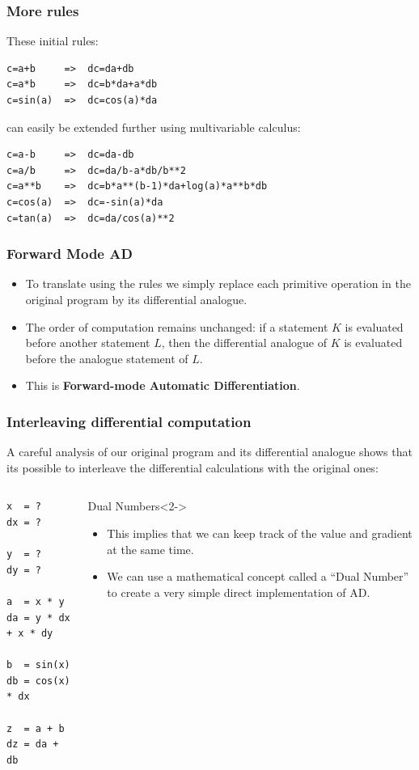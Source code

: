 \documentclass[]{article}
\begin{document}
\begin{frame}[fragile]
\frametitle{More rules}

These initial rules:
\begin{lstlisting}
c=a+b     =>  dc=da+db
c=a*b     =>  dc=b*da+a*db
c=sin(a)  =>  dc=cos(a)*da
\end{lstlisting}
can easily be extended further using multivariable calculus:
\begin{lstlisting}
c=a-b     =>  dc=da-db
c=a/b     =>  dc=da/b-a*db/b**2
c=a**b    =>  dc=b*a**(b-1)*da+log(a)*a**b*db
c=cos(a)  =>  dc=-sin(a)*da
c=tan(a)  =>  dc=da/cos(a)**2
\end{lstlisting}
\end{frame}

\begin{frame}
\frametitle{Forward Mode AD}
\begin{itemize}
	\item<+-> To translate using the rules we simply replace each primitive operation in the original program by its differential analogue.
	\item<+-> The order of computation remains unchanged: if a statement $K$ is evaluated before another statement $L$, then the differential analogue of $K$ is evaluated before the analogue statement of $L$.
	\item<+-> This is \textbf{Forward-mode Automatic Differentiation}.
\end{itemize}
\end{frame}

\begin{frame}[fragile]
\frametitle{Interleaving differential computation}

A careful analysis of our original program and its differential analogue shows that its possible to interleave the differential calculations with the original ones:
\begin{columns}
\begin{lstlisting}
x  = ?
dx = ?

y  = ?
dy = ?

a  = x * y
da = y * dx + x * dy

b  = sin(x)
db = cos(x) * dx

z  = a + b
dz = da + db
\end{lstlisting}

\begin{block}{Dual Numbers}<2->
	\begin{itemize}
		\item<2-> This implies that we can keep track of the value and gradient at the same time.
		\item<3-> We can use a mathematical concept called a ``Dual Number'' to create a very simple direct implementation of AD.
	\end{itemize}
\end{block}

\end{columns}
\end{frame}
\end{document}
